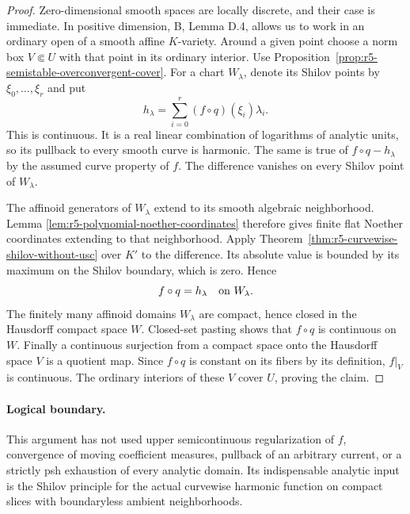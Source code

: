 \documentclass[11pt,a4paper]{article}
\numberwithin{equation}{section}
\theoremstyle{definition}
\theoremstyle{remark}
\begin{document}
\begin{proof}
Zero-dimensional smooth spaces are locally discrete, and their
case is immediate. In positive dimension, B, Lemma D.4,
allows us to work in an ordinary open of a smooth affine
$K$-variety. Around a given point choose a norm box
$V\Subset U$ with that point in its ordinary interior.
Use Proposition~\ref{prop:r5-semistable-overconvergent-cover}.
For a chart $W_\lambda$, denote its Shilov points
by $\xi_0,\ldots,\xi_r$ and put
\[
 h_\lambda=\sum_{i=0}^r(f\circ q)(\xi_i)\lambda_i .
\]
This is continuous. It is a real linear combination of logarithms
of analytic units, so its pullback to every smooth curve
is harmonic. The same is true of $f\circ q-h_\lambda$
by the assumed curve property of $f$. The difference vanishes
on every Shilov point of $W_\lambda$.

The affinoid generators of $W_\lambda$ extend to its smooth
algebraic neighborhood. Lemma
\ref{lem:r5-polynomial-noether-coordinates} therefore gives
finite flat Noether coordinates extending to that neighborhood.
Apply Theorem~\ref{thm:r5-curvewise-shilov-without-usc}
over $K'$ to the difference.
Its absolute value is bounded by its maximum on the Shilov
boundary, which is zero. Hence
\[
                      f\circ q=h_\lambda
                       \quad\hbox{on }W_\lambda.
\]
The finitely many affinoid domains $W_\lambda$ are compact,
hence closed in the Hausdorff compact space $W$. Closed-set
pasting shows that $f\circ q$ is continuous on $W$. Finally
a continuous surjection from a compact space onto the Hausdorff
space $V$ is a quotient map. Since $f\circ q$ is constant on
its fibers by its definition, $f|_V$ is continuous. The
ordinary interiors of these $V$ cover $U$, proving the claim.
\end{proof}

\paragraph{Logical boundary.}
This argument has not used upper semicontinuous regularization
of $f$, convergence of moving coefficient measures, pullback
of an arbitrary current, or a strictly psh exhaustion of
every analytic domain. Its indispensable analytic input is
the Shilov principle for the actual curvewise harmonic
function on compact slices with boundaryless ambient
neighborhoods.




\end{document}
